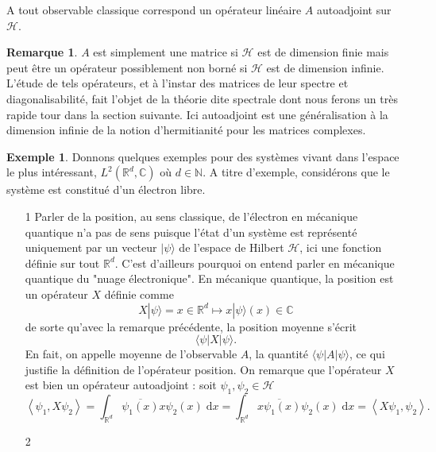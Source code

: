 \documentclass[12pt,openany,a4paper, titlepage]{article}
\newcommand{\la}{\left\langle}
\newcommand{\ra}{\right\rangle}
\newcommand{\dd}{\;\mathrm{d}}
\newcommand{\R}{\mathbb{R}}
\newcommand{\C}{\mathbb{C}}
\newcommand{\N}{\mathbb{N}}
\newcommand{\HH}{\mathcal{H}}
\theoremstyle{definition}
\theoremstyle{definition}
\theoremstyle{definition}
\newtheorem{ex}{Exemple}
\theoremstyle{definition}
\theoremstyle{definition}
\newtheorem{rem}{Remarque}
\theoremstyle{definition}
\begin{document}
\vspace{3mm}
\begin{tcolorbox}[colback=gray!5!white,
                  colframe=gray!80!white,
                  title= Postulat 2 : Principe de correspondance ]
A tout observable classique correspond un opérateur linéaire $A$ autoadjoint sur $\HH$.
\end{tcolorbox}
\vspace{3mm}

\begin{rem}
    $A$ est simplement une matrice si $\HH$ est de dimension finie mais peut être un opérateur possiblement non borné si $\HH$ est de dimension infinie. L'étude de tels opérateurs, et à l'instar des matrices de leur spectre et diagonalisabilité, fait l'objet de la théorie dite spectrale dont nous ferons un très rapide tour dans la section suivante. Ici autoadjoint est une généralisation à la dimension infinie de la notion d'hermitianité pour les matrices complexes.
\end{rem}

\begin{ex} 
Donnons quelques exemples pour des systèmes vivant dans l'espace le plus intéressant, $L^2(\R^d,\C)$ où $d\in\N$. A titre d'exemple, considérons que le système est constitué d'un électron libre.
\begin{enumerate}
    \item[1] Parler de la position, au sens classique, de l'électron en mécanique quantique n'a pas de sens puisque l'état d'un système est représenté uniquement par un vecteur $|\psi\rangle$ de l'espace de Hilbert $\HH$, ici une fonction définie sur tout $\R^d$. C'est d'ailleurs pourquoi on entend parler en mécanique quantique du "nuage électronique". En mécanique quantique, la position est un opérateur $X$ définie comme $$X|\psi\rangle = x\in \R^d \mapsto x|\psi\rangle(x) \in \C$$ de sorte qu'avec la remarque précédente, la position moyenne s'écrit $$ \langle \psi | X | \psi \rangle.$$ En fait, on appelle moyenne de l'observable $A$, la quantité $\langle \psi | A | \psi \rangle$, ce qui justifie la définition de l'opérateur position. On remarque que l'opérateur $X$ est bien un opérateur autoadjoint : soit $\psi_1, \psi_2 \in \HH$
    \begin{equation}
        \la\psi_1, X\psi_2\ra =\int_{\R^d}\overline{\psi_1(x)}x\psi_2(x) \dd x
        = \int_{\R^d}\overline{x\psi_1(x)}\psi_2(x) \dd x 
        = \la X\psi_1, \psi_2\ra.
    \end{equation}
    \item[2]
\end{enumerate}
\end{ex}
\end{document}
